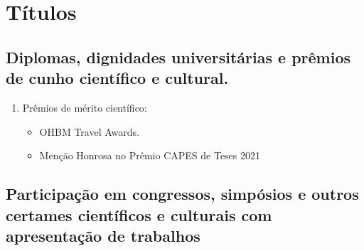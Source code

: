 \documentclass[a4paper,oneside,10pt]{article}
\newcounter{document}%
\begin{document}
\section{Títulos}
\subsection{Diplomas, dignidades universitárias e prêmios de cunho científico e cultural.}
\large{
\begin{enumerate}
        \item Prêmios de mérito científico:
        \begin{itemize}
                \item OHBM Travel Awards. \mbox{} \\
                \item Menção Honrosa no Prêmio CAPES de Teses 2021 \mbox{} \\
        \end{itemize}
\end{enumerate}}



\subsection{\large{Participação  em  congressos,  simpósios  e  outros  certames  científicos  e  culturais  com apresentação  de  trabalhos}}
\vspace{0.3cm}
\end{document}
